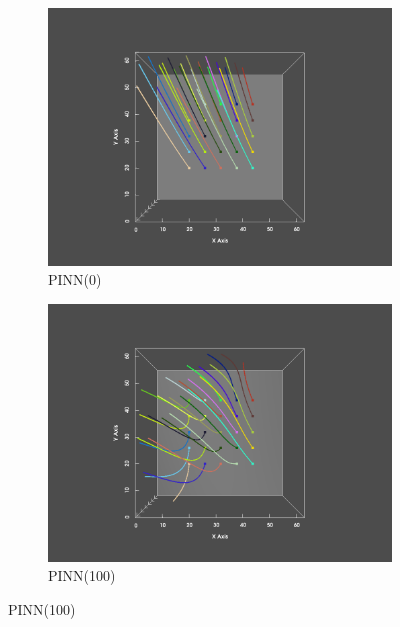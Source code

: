 \begin{figure}
  \begin{subfigure}{.5\linewidth}
    \centering
    \caption{PINN(0)}\label{fig:xy0}
    \includegraphics[trim={6cm 1cm 6cm 2cm}, clip, width=\linewidth]{"img/PINN_000000_xy.pdf"}
  \end{subfigure}%
  \begin{subfigure}{.5\linewidth}
    \centering
    \caption{PINN(100)}
    \includegraphics[trim={6cm 1cm 6cm 2cm}, clip, width=\linewidth]{"img/PINN_000100_xy.pdf"}
  \end{subfigure}


\end{figure}
